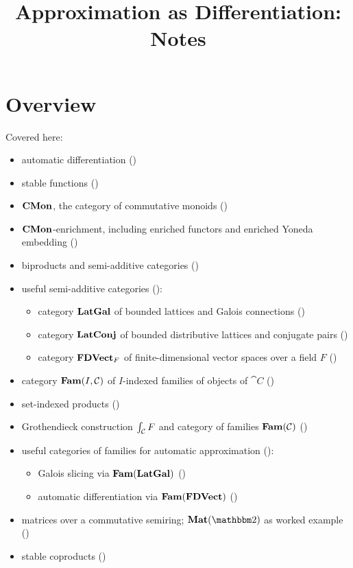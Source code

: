 \documentclass[acmsmall,screen]{acmart}
\begin{document}
\title{Approximation as Differentiation: Notes}

\maketitle

\section{Overview}

Covered here:
\begin{itemize}
\item automatic differentiation ()
\item stable functions ()
\item $\mathbf{CMon}$, the category of commutative monoids ()
\item $\mathbf{CMon}$-enrichment, including enriched functors and enriched Yoneda embedding ()
\item biproducts and semi-additive categories ()
\item useful semi-additive categories ():
   \begin{itemize}
   \item category $\mathbf{LatGal}$ of bounded lattices and Galois connections ()
   \item category $\mathbf{LatConj}$ of bounded distributive lattices and conjugate pairs
   ()
   \item category $\mathbf{FDVect}_F$ of finite-dimensional vector spaces over a field $F$
   ()
   \end{itemize}
\item category $\mathbf{Fam}(I,\mathcal{C})$ of $I$-indexed families of objects of $\cat{C}$ ()
\item set-indexed products ()
\item Grothendieck construction $\int_{\mathcal{C}}F$ and category of families $\mathbf{Fam}(\mathcal{C})$
()
\item useful categories of families for automatic approximation
():
   \begin{itemize}
      \item Galois slicing via $\mathbf{Fam}(\mathbf{LatGal})$ ()
      \item automatic differentiation via $\mathbf{Fam}(\mathbf{FDVect})$ ()
   \end{itemize}
\item matrices over a commutative semiring; $\Mat(\Two)$ as worked example ()
\item stable coproducts ()
\end{itemize}
\end{document}
